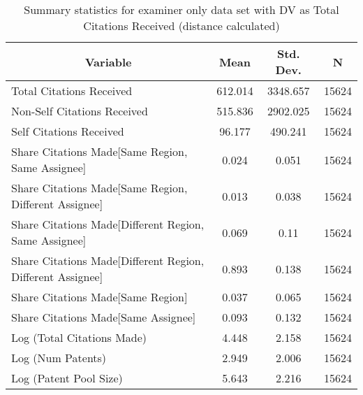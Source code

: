 
\begin{table}[htbp]\centering \caption{Summary statistics for examiner only data set with DV as Total Citations Received (distance calculated) \label{e.tsummary}}
\begin{tabular}{l c c  c}\hline\hline
\multicolumn{1}{c}{\textbf{Variable}} & \textbf{Mean}
 & \textbf{Std. Dev.} & \textbf{N}\\ \hline
Total Citations Received & 612.014 & 3348.657  & 15624\\
Non-Self Citations Received & 515.836 & 2902.025  & 15624\\
Self Citations Received & 96.177 & 490.241  & 15624\\
Share Citations Made[Same Region, Same Assignee] & 0.024 & 0.051  & 15624\\
Share Citations Made[Same Region, Different Assignee] & 0.013 & 0.038  & 15624\\
Share Citations Made[Different Region, Same Assignee] & 0.069 & 0.11  & 15624\\
Share Citations Made[Different Region, Different Assignee] & 0.893 & 0.138  & 15624\\
Share Citations Made[Same Region] & 0.037 & 0.065  & 15624\\
Share Citations Made[Same Assignee] & 0.093 & 0.132  & 15624\\
Log (Total Citations Made) & 4.448 & 2.158  & 15624\\
Log (Num Patents) & 2.949 & 2.006  & 15624\\
Log (Patent Pool Size) & 5.643 & 2.216  & 15624\\
\hline\end{tabular}
\end{table}
